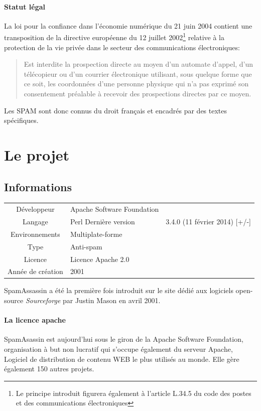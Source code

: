 \documentclass[a4paper,11pt]{article}
\begin{document}
\paragraph{Statut légal}


La loi pour la confiance dans l'économie numérique du 21 juin 2004 contient une transposition de la
directive européenne du 12 juillet 2002\footnote{Le principe introduit figurera également à l'article L.34.5 du code 
des postes et des communications électroniques } relative à la protection de la vie privée dans le secteur des communications
électroniques:
\begin{quote}
 Est interdite la prospection directe au moyen d'un automate d'appel, d'un télécopieur ou d'un courrier électronique utilisant,
 sous quelque forme que ce soit, les coordonnées d'une personne physique qui n'a pas exprimé son consentement préalable à recevoir
 des prospections directes par ce moyen. 
\end{quote}
Les SPAM sont donc connus du droit français et encadrés par des textes spécifiques.

\section{Le projet}

\subsection{Informations}


\begin{center}
\begin{tabular}{cll}
\hline
Développeur & Apache Software Foundation  \\
Langage & Perl 
Dernière version & 3.4.0 (11 février 2014) [+/-] \\
Environnements & Multiplate-forme  \\
Type & Anti-spam & \\
Licence & Licence Apache 2.0 \\ 
Année de création & 2001 \\
\hline
\end{tabular}
\end{center}

SpamAssassin a été la première fois introduit sur le site dédié aux logiciels open-source \emph{Sourceforge}
par Justin Mason en avril 2001.

\paragraph{La licence apache}
SpamAsassin est aujourd'hui sous le giron de la Apache Software Foundation, organisation à but non lucratif qui
s'occupe également du serveur Apache, Logiciel de distribution de contenu WEB le plus utilisés au monde. 
Elle gère également 150 autres projets.
\end{document}
